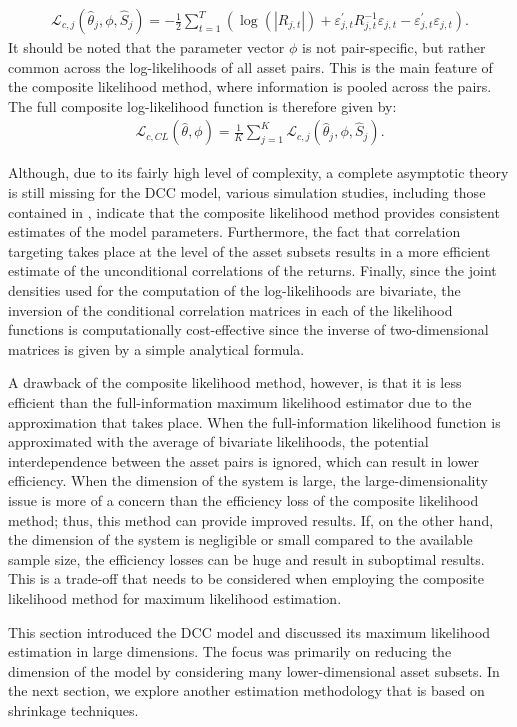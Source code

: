 \begin{align}
	\mathcal{L}_{c,j}(\widehat{\theta}_j,\phi,\widehat{S}_j) = -\frac{1}{2} \sum_{t=1}^T \left( \operatorname{log}\left( |R_{j,t}| \right) + \varepsilon_{j,t}^\prime R_{j,t}^{-1}\varepsilon_{j,t} - \varepsilon_{j,t}^\prime \varepsilon_{j,t} \right).
\end{align}
It should be noted that the parameter vector $\phi$ is not pair-specific, but rather common across the log-likelihoods of all asset pairs. This is the main feature of the composite likelihood method, where information is pooled across the pairs. The full composite log-likelihood function is therefore given by:
\begin{align}
	\mathcal{L}_{c,CL}(\widehat{\theta},\phi) = \frac{1}{K} \sum_{j=1}^K \mathcal{L}_{c,j}(\widehat{\theta}_j,\phi,\widehat{S}_j).
\end{align}

Although, due to its fairly high level of complexity, a complete asymptotic theory is still missing for the DCC model, various simulation studies, including those contained in \textcite{PAKELETAL}, indicate that the composite likelihood method provides consistent estimates of the model parameters. Furthermore, the fact that correlation targeting takes place at the level of the asset subsets results in a more efficient estimate of the unconditional correlations of the returns. Finally, since the joint densities used for the computation of the log-likelihoods are bivariate, the inversion of the conditional correlation matrices in each of the likelihood functions is computationally cost-effective since the inverse of two-dimensional matrices is given by a simple analytical formula.

A drawback of the composite likelihood method, however, is that it is less efficient than the full-information maximum likelihood estimator due to the approximation that takes place. When the full-information likelihood function is approximated with the average of bivariate likelihoods, the potential interdependence between the asset pairs is ignored, which can result in lower efficiency. When the dimension of the system is large, the large-dimensionality issue is more of a concern than the efficiency loss of the composite likelihood method; thus, this method can provide improved results. If, on the other hand, the dimension of the system is negligible or small compared to the available sample size, the efficiency losses can be huge and result in suboptimal results. This is a trade-off that needs to be considered when employing the composite likelihood method for maximum likelihood estimation. 

This section introduced the DCC model and discussed its maximum likelihood estimation in large dimensions. The focus was primarily on reducing the dimension of the model by considering many lower-dimensional asset subsets. In the next section, we explore another estimation methodology that is based on shrinkage techniques.